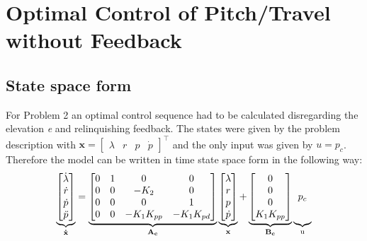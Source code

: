 \section{Optimal Control of Pitch/Travel without Feedback}\label{sec:prob2}

\subsection{State space form}\label{sec:prob21}
For Problem 2 an optimal control sequence had to be calculated disregarding the elevation \emph{e} and relinquishing feedback. The states were given by the problem description with $\mathbf{x}= \begin{bmatrix} \lambda & r & p & \dot p \end{bmatrix}^\top$ and the only input was given by $u = p_c$. Therefore the model can be written in time state space form in the following way: 
\begin{equation} \label{statespace2}
	\underbrace{\begin{bmatrix}
		\dot \lambda \\
		\dot r \\
		\dot p \\
		\ddot p
	\end{bmatrix}}_\text{$\mathbf{\dot x}$}
	=
	\underbrace{\begin{bmatrix}	
				0 & 1 & 0 & 0 \\
				0 & 0 & -K_2	& 0 \\
				0 & 0 & 0 & 1 \\
				0 & 0 & -K_1K_{pp} & -K_1K_{pd}
	\end{bmatrix}}_\text{$\mathbf{A_c}$}
	\underbrace{\begin{bmatrix}
		\lambda \\
		r \\
		p \\
		\dot p
	\end{bmatrix}}_\text{$\mathbf{x}$}
	+
	\underbrace{\begin {bmatrix}	
				0 \\
				0 \\
				0 \\
				K_1K_{pp}			
	\end{bmatrix}}_\text{$\mathbf{B_c}$}
	\underbrace{
		\vphantom { 
			\begin {bmatrix}	
				0 \\
				0 \\
				0 \\
				K_1K_{pp}			
			\end{bmatrix}
		}
		p_c
	}_\text{u}
\end{equation}

